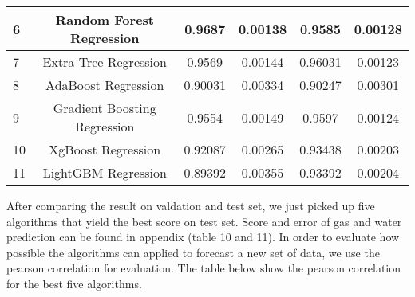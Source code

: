 \documentclass[english]{article}
\begin{document}
\begin{table}[H]
\begin{tabular}{|l|c|c|c|c|c|}
6           & Random Forest Regression                 & 0.9687                                              & 0.00138                                             & 0.9585                                        & 0.00128                                       \\ \hline
7           & Extra Tree Regression                    & 0.9569                                              & 0.00144                                             & 0.96031                                       & 0.00123                                       \\ \hline
8           & AdaBoost Regression                      & 0.90031                                             & 0.00334                                             & 0.90247                                       & 0.00301                                       \\ \hline
9           & Gradient Boosting Regression             & 0.9554                                              & 0.00149                                             & 0.9597                                        & 0.00124                                       \\ \hline
10          & XgBoost Regression                       & 0.92087                                             & 0.00265                                             & 0.93438                                       & 0.00203                                       \\ \hline
11          & LightGBM Regression                      & 0.89392                                             & 0.00355                                             & 0.93392                                       & 0.00204                                       \\ \hline
\end{tabular}
\end{table}
After comparing the result on valdation and test set, we just picked up five algorithms that yield the best score on test set. Score and error of gas and water prediction can be found in appendix (table 10 and 11).
In order to evaluate how possible the algorithms can applied to forecast a new set of data, we use the pearson correlation for evaluation. The table below show the pearson correlation for the best five algorithms.
\end{document}
